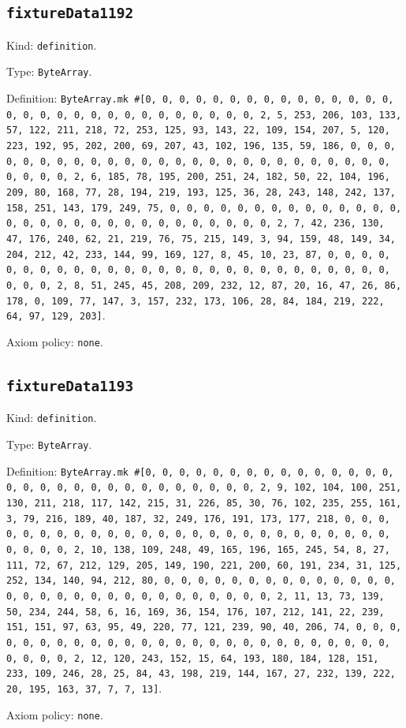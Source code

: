 \documentclass[11pt]{article}
\begin{document}
\subsection*{\texttt{fixtureData1192}}
\noindent Kind: \texttt{definition}.\par
\noindent Type: \texttt{ByteArray}.\par
\noindent Definition: \texttt{ByteArray.mk \#[0, 0, 0, 0, 0, 0, 0, 0, 0, 0, 0, 0, 0, 0, 0, 0, 0, 0, 0, 0, 0, 0, 0, 0, 0, 0, 0, 0, 0, 0, 2, 5, 253, 206, 103, 133, 57, 122, 211, 218, 72, 253, 125, 93, 143, 22, 109, 154, 207, 5, 120, 223, 192, 95, 202, 200, 69, 207, 43, 102, 196, 135, 59, 186, 0, 0, 0, 0, 0, 0, 0, 0, 0, 0, 0, 0, 0, 0, 0, 0, 0, 0, 0, 0, 0, 0, 0, 0, 0, 0, 0, 0, 0, 0, 2, 6, 185, 78, 195, 200, 251, 24, 182, 50, 22, 104, 196, 209, 80, 168, 77, 28, 194, 219, 193, 125, 36, 28, 243, 148, 242, 137, 158, 251, 143, 179, 249, 75, 0, 0, 0, 0, 0, 0, 0, 0, 0, 0, 0, 0, 0, 0, 0, 0, 0, 0, 0, 0, 0, 0, 0, 0, 0, 0, 0, 0, 0, 0, 2, 7, 42, 236, 130, 47, 176, 240, 62, 21, 219, 76, 75, 215, 149, 3, 94, 159, 48, 149, 34, 204, 212, 42, 233, 144, 99, 169, 127, 8, 45, 10, 23, 87, 0, 0, 0, 0, 0, 0, 0, 0, 0, 0, 0, 0, 0, 0, 0, 0, 0, 0, 0, 0, 0, 0, 0, 0, 0, 0, 0, 0, 0, 0, 2, 8, 51, 245, 45, 208, 209, 232, 12, 87, 20, 16, 47, 26, 86, 178, 0, 109, 77, 147, 3, 157, 232, 173, 106, 28, 84, 184, 219, 222, 64, 97, 129, 203]}.\par
\noindent Axiom policy: \texttt{none}.\par
\subsection*{\texttt{fixtureData1193}}
\noindent Kind: \texttt{definition}.\par
\noindent Type: \texttt{ByteArray}.\par
\noindent Definition: \texttt{ByteArray.mk \#[0, 0, 0, 0, 0, 0, 0, 0, 0, 0, 0, 0, 0, 0, 0, 0, 0, 0, 0, 0, 0, 0, 0, 0, 0, 0, 0, 0, 0, 0, 2, 9, 102, 104, 100, 251, 130, 211, 218, 117, 142, 215, 31, 226, 85, 30, 76, 102, 235, 255, 161, 3, 79, 216, 189, 40, 187, 32, 249, 176, 191, 173, 177, 218, 0, 0, 0, 0, 0, 0, 0, 0, 0, 0, 0, 0, 0, 0, 0, 0, 0, 0, 0, 0, 0, 0, 0, 0, 0, 0, 0, 0, 0, 0, 2, 10, 138, 109, 248, 49, 165, 196, 165, 245, 54, 8, 27, 111, 72, 67, 212, 129, 205, 149, 190, 221, 200, 60, 191, 234, 31, 125, 252, 134, 140, 94, 212, 80, 0, 0, 0, 0, 0, 0, 0, 0, 0, 0, 0, 0, 0, 0, 0, 0, 0, 0, 0, 0, 0, 0, 0, 0, 0, 0, 0, 0, 0, 0, 2, 11, 13, 73, 139, 50, 234, 244, 58, 6, 16, 169, 36, 154, 176, 107, 212, 141, 22, 239, 151, 151, 97, 63, 95, 49, 220, 77, 121, 239, 90, 40, 206, 74, 0, 0, 0, 0, 0, 0, 0, 0, 0, 0, 0, 0, 0, 0, 0, 0, 0, 0, 0, 0, 0, 0, 0, 0, 0, 0, 0, 0, 0, 0, 2, 12, 120, 243, 152, 15, 64, 193, 180, 184, 128, 151, 233, 109, 246, 28, 25, 84, 43, 198, 219, 144, 167, 27, 232, 139, 222, 20, 195, 163, 37, 7, 7, 13]}.\par
\noindent Axiom policy: \texttt{none}.\par
\end{document}
